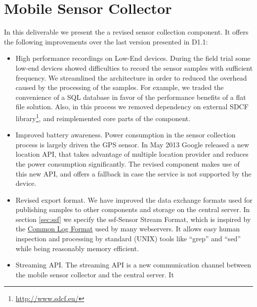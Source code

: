 \label{chap:SensorCollection}

\section{Mobile Sensor Collector}
\label{sec:SensorColllection}

In this deliverable we present the a revised sensor collection
component. It offers the following improvements over the last version
presented in D1.1:
\begin{itemize}
\item High performance recordings on Low-End devices. During the field
  trial some low-end devices showed difficulties to record the sensor
  samples with sufficient frequency. We streamlined the architecture
  in order to reduced the overhead caused by the processing of the
  samples. For example, we traded the convenience of a SQL database in
  favor of the performance benefits of a flat file solution.  Also, in
  this process we removed dependency on external SDCF
  library\footnote{\url{http://www.sdcf.eu/}}, and reimplemented core
  parts of the component.
\item Improved battery awareness. Power consumption in the sensor
  collection process is largely driven the GPS sensor. In May 2013
  Google released a new location API, that takes advantage of multiple
  location provider and reduces the power consumption significantly.
  The revised component makes use of this new API, and offers a
  fallback in case the service is not supported by the device.
\item Revised export format. We have improved the data exchange
  formats used for publishing samples to other components and storage
  on the central server. In section \ref{sec:ssf} we specify the
  ssf-Sensor Stream Format, which is inspired by the
  \href{http://en.wikipedia.org/wiki/Common\_Log\_Format}{Common Log
    Format} used by many webservers. It allows easy human inspection
  and processing by standard (UNIX) tools like ``grep'' and ``sed''
  while being reasonably memory efficient.
\item Streaming API. The streaming API is a new communication channel
  between the mobile sensor collector and the central server. It

\end{itemize}
